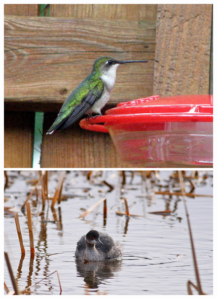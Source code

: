 \documentclass[10pt, a4paper]{article}
\begin{document}
\begin{figure}[h]
\begin{minipage}[b]{0.8\linewidth}
{\begin{minipage}[b]{0.31\linewidth}
        \includegraphics[width=\linewidth]{imgs/raw-2009_003399.jpg}\vspace{0pt}
        \includegraphics[width=\linewidth]{imgs/raw-2009_004375.jpg}
      \end{minipage}
    }
\end{minipage}
\end{figure}
\end{document}
